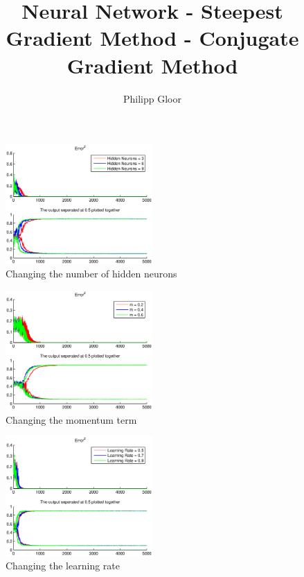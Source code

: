\documentclass[10pt]{article}
\renewcommand{\sectionmark}[1]{\markboth{\MakeUppercase{#1}}{}}
\begin{document}
\title{Neural Network - Steepest Gradient Method - Conjugate Gradient Method}
\author{Philipp Gloor}
\maketitle
\begin{abstract}

\end{abstract}
\newpage
\pagestyle{fancy}
\renewcommand{\sectionmark}[1]{\markright{#1}{}}
\begin{figure}
\centering
\includegraphics[width=0.5\textwidth]{exp29b_hidden_neurons}
\caption{Changing the number of hidden neurons}
\end{figure}

\begin{figure}
\centering
\includegraphics[width=0.5\textwidth]{exp29b_momentum_term}
\caption{Changing the momentum term}
\end{figure}

\begin{figure}
\centering
\includegraphics[width=0.5\textwidth]{exp29b_learning_rate}
\caption{Changing the learning rate}
\end{figure}
\end{document}
